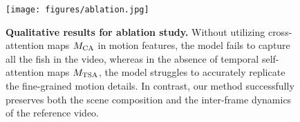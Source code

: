 \begin{figure}[t]
  \centering
  \texttt{[image: figures/ablation.jpg]}
  \caption{\textbf{Qualitative results for ablation study.} Without utilizing cross-attention maps $M_{{\rm CA}}$ in motion features, the model fails to capture all the fish in the video, whereas in the absence of temporal self-attention maps $M_{{\rm TSA}}$, the model struggles to accurately replicate the fine-grained motion details. In contrast, our method successfully preserves both the scene composition and the inter-frame dynamics of the reference video.}
  \label{fig:ablation}
\end{figure}